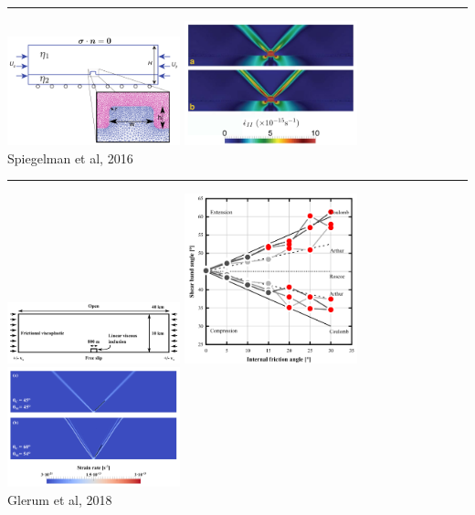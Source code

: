 \begin{center}\noindent\rule{8cm}{0.4pt}\end{center}

\begin{center}
\includegraphics[width=5cm]{images/benchmark_brick/spmw16a}
\includegraphics[width=5cm]{images/benchmark_brick/spmw16b}\\
{\small Spiegelman et al, 2016 \cite{spmw16}}
\end{center}

\begin{center}\noindent\rule{8cm}{0.4pt}\end{center}

\begin{center}
\includegraphics[width=5cm]{images/benchmark_brick/gltf18a}
\includegraphics[width=5cm]{images/benchmark_brick/gltf18b}
\includegraphics[width=5cm]{images/benchmark_brick/gltf18c}\\
{\small Glerum et al, 2018 \cite{gltf18}}
\end{center}

